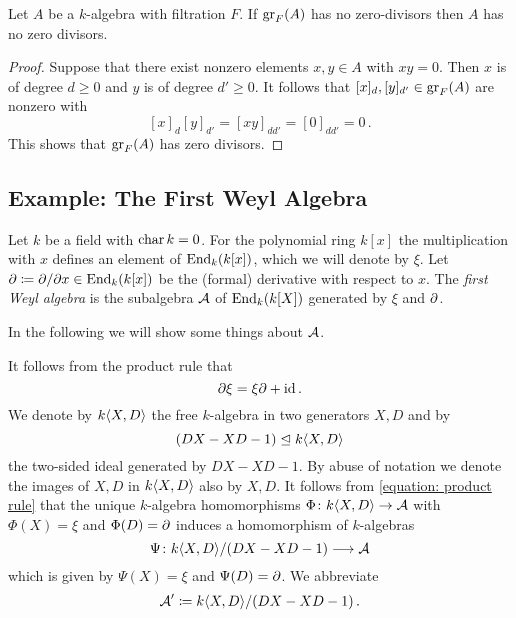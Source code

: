 \begin{lemma}
  \label{lemma: associated graded reflects no zero divisors}
  Let $A$ be a $k$-algebra with filtration $F$.
  If $\operatorname{gr}_F(A)$ has no zero-divisors then $A$ has no zero divisors.
\end{lemma}


\begin{proof}
  Suppose that there exist nonzero elements $x, y \in A$ with $xy = 0$.
  Then $x$ is of degree $d \geq 0$ and $y$ is of degree $d' \geq 0$.
  It follows that $[x]_d, [y]_{d'} \in \operatorname{gr}_F(A)$ are nonzero with
  \[
      [x]_d [y]_{d'}
    = [xy]_{d d'}
    = [0]_{d d'}
    = 0 \,.
  \]
  This shows that $\operatorname{gr}_F(A)$ has zero divisors.
\end{proof}






\subsection{Example: The First Weyl Algebra}
\label{subsection: first weyl algebra}


\begin{fluff}
  Let $k$ be a field with $\operatorname{char} k = 0$.
  For the polynomial ring $k[x]$ the multiplication with $x$ defines an element of $\operatorname{End}_k(k[x])$, which we will denote by $\xi$.
  Let $\partial \coloneqq \partial/\partial x \in \operatorname{End}_k(k[x])$ be the (formal) derivative with respect to $x$.
  The \emph{first Weyl algebra} is the subalgebra $\operatorname{\mathcal{A}}$ of $\operatorname{End}_k(k[X])$ generated by $\xi$ and $\partial$.
  
  In the following we will show some things about $\operatorname{\mathcal{A}}$.
\end{fluff}


\begin{fluff}
  It follows from the product rule that
  \begin{equation}
  \label{equation: product rule}
      \partial \xi
    = \xi \partial + {\operatorname{id}} \,.
  \end{equation}
  We denote by $k\!\left\langle X,D \right\rangle$ the free $k$-algebra in two generators $X,D$ and by
  \[
              (DX - XD - 1)
    \trianglelefteq k\!\left\langle X,D \right\rangle
  \]
  the two-sided ideal generated by $DX - XD - 1$.
  By abuse of notation we denote the images of $X, D$ in $k\!\left\langle X,D \right\rangle$ also by $X, D$.
  It follows from \eqref{equation: product rule} that the unique $k$-algebra homomorphisms $\Phi \colon k\!\left\langle X,D \right\rangle \to \operatorname{\mathcal{A}}$ with $\Phi(X) = \xi$ and $\Phi(D) = \partial$ induces a homomorphism of $k$-algebras
  \[
            \Psi
    \colon  k\!\left\langle X,D \right\rangle\!/(DX - XD - 1)
    \longrightarrow \operatorname{\mathcal{A}}
  \]
  which is given by $\Psi(X) = \xi$ and $\Psi(D) = \partial$.
  We abbreviate
  \[
              \operatorname{\mathcal{A}}'
    \coloneqq  k\!\left\langle X,D \right\rangle\!/(DX - XD - 1) \,.
  \]
\end{fluff}


